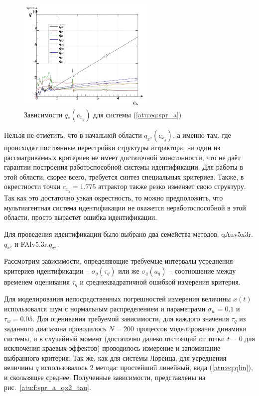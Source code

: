 \begin{figure}[htb!]
\centerline{
  \includegraphics[width=0.60\textwidth]{p/cha/spr_a/sprott_a_q-p_c_x_y.png}
}
\caption{Зависимости $q_{*}(c_{x_y})$ для системы (\ref{atu:eq:spr_a}) }
\label{atu:f:spr_a_q}
\end{figure}

Нельзя не отметить, что в начальной области
$q_{x^2}(c_{x_y}) $, а именно там, где происходят постоянные
перестройки структуры аттрактора, ни один из рассматриваемых критериев
не имеет достаточной монотонности, что не даёт гарантии
построения работоспособной системы идентификации.
Для работы в этой области, скорее всего, требуется синтез специальных критериев.
Также, в окрестности точки $c_{x_y}=1.775$ аттрактор также резко изменяет свою структуру.
Так как это достаточно узкая окрестность,
то можно предположить, что мультиагентная система идентификации
не окажется неработоспособной в этой области, просто вырастет
ошибка идентификации.

Для проведения идентификации было выбрано два семейства методов:
qAuv5x3r.$q_{x^2}$ и
FAlv5.3r.$q_{x^2}$.

Рассмотрим зависимости, определяющие
требуемые интервалы усреднения критериев идентификации
-- $ \sigma_q(\tau_q) $
или же  $ \sigma_q(a_q) $ -- соотношение между
временем оценивания $\tau_q$ и среднеквадратичной
ошибкой измерения критерия.

Для моделирования непосредственных погрешностей измерения величины
$x(t)$ использовался шум с нормальным распределением
и параметрами $\sigma_w=0.1$ и $\tau_w=0.05$.
Для оценивания требуемой зависимости, для каждого
значения $\tau_q$ из заданного диапазона
проводилось $N=200$ процессов моделирования динамики системы,
и в случайный момент (достаточно далеко отстоящий от точки $t=0$ для исключения краевых эффектов)
проводилось измерение и запоминание выбранного критерия.
Так же, как для системы Лоренца,
для усреднения величины $q$ использовалось 2 метода:
простейший линейный, вида (\ref{atu:eq:qlin}), и скользящее среднее.
Полученные зависимости,  представлены на
рис.~\ref{atu:f:spr_a_qx2_tau}.


